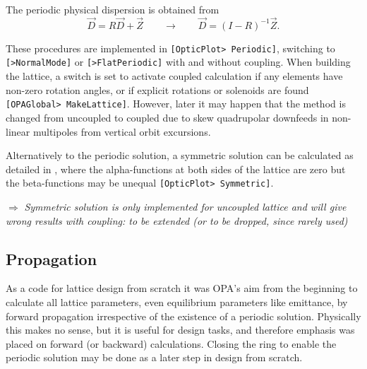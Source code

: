 \documentclass[12pt]{article}
\newcommand\beq{\begin{equation}}
\newcommand\eeq{\end{equation}}
\newcommand\todo[1]{$\Longrightarrow$ {\em #1} }
\newcommand\code[1]{{\tt [#1]}}
\begin{document}
The periodic physical dispersion is obtained from
\beq
\vec{D}=R \vec{D}+\vec{Z} \qquad \longrightarrow \qquad \vec{D}=(I-R)^{-1} \vec{Z}.
\eeq

These procedures are implemented in \code{OpticPlot> Periodic}, switching to \code{>NormalMode} or \code{>FlatPeriodic} with and without coupling.
When building the lattice, a switch is set to activate coupled calculation if any elements have non-zero rotation angles, or if explicit rotations or solenoids are found \code{OPAGlobal> MakeLattice}. However, later it may happen that the method is changed from uncoupled to coupled due to skew quadrupolar downfeeds in non-linear multipoles from vertical orbit excursions.

Alternatively to the periodic solution, a symmetric solution can be calculated as detailed in \cite{wille}, where the alpha-functions at both sides of the lattice are zero but the beta-functions may be unequal \code{OpticPlot> Symmetric}.

\todo{Symmetric solution is only implemented for uncoupled lattice and will give wrong results with coupling: to be extended (or to be dropped, since rarely used)}

\subsection{Propagation}
As a code for lattice design from scratch it was OPA's aim from the beginning to calculate all lattice parameters, even equilibrium parameters like emittance, by forward propagation irrespective of the existence of a periodic solution. Physically this makes no sense, but it is useful for design tasks, and therefore emphasis was placed on forward (or backward) calculations. Closing the ring to enable the periodic solution may be done as a later step in design from scratch.
\end{document}
